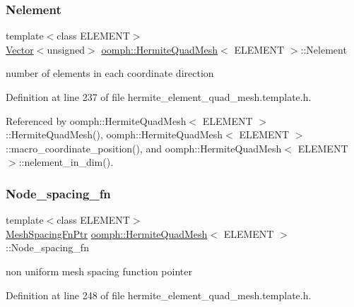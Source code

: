 \subsubsection{\texorpdfstring{Nelement}{Nelement}}
{\footnotesize\ttfamily template$<$class E\+L\+E\+M\+E\+NT$>$ \\
\hyperlink{classoomph_1_1Vector}{Vector}$<$unsigned$>$ \hyperlink{classoomph_1_1HermiteQuadMesh}{oomph\+::\+Hermite\+Quad\+Mesh}$<$ E\+L\+E\+M\+E\+NT $>$\+::Nelement\hspace{0.3cm}{\ttfamily [private]}}



number of elements in each coordinate direction 



Definition at line 237 of file hermite\+\_\+element\+\_\+quad\+\_\+mesh.\+template.\+h.



Referenced by oomph\+::\+Hermite\+Quad\+Mesh$<$ E\+L\+E\+M\+E\+N\+T $>$\+::\+Hermite\+Quad\+Mesh(), oomph\+::\+Hermite\+Quad\+Mesh$<$ E\+L\+E\+M\+E\+N\+T $>$\+::macro\+\_\+coordinate\+\_\+position(), and oomph\+::\+Hermite\+Quad\+Mesh$<$ E\+L\+E\+M\+E\+N\+T $>$\+::nelement\+\_\+in\+\_\+dim().

\mbox{\label{classoomph_1_1HermiteQuadMesh_a3b3cc55576538fc29e6975def870536f}} 
\subsubsection{\texorpdfstring{Node\+\_\+spacing\+\_\+fn}{Node\_spacing\_fn}}
{\footnotesize\ttfamily template$<$class E\+L\+E\+M\+E\+NT$>$ \\
\hyperlink{classoomph_1_1HermiteQuadMesh_abebf4806b300591f976398404ed0ef3f}{Mesh\+Spacing\+Fn\+Ptr} \hyperlink{classoomph_1_1HermiteQuadMesh}{oomph\+::\+Hermite\+Quad\+Mesh}$<$ E\+L\+E\+M\+E\+NT $>$\+::Node\+\_\+spacing\+\_\+fn\hspace{0.3cm}{\ttfamily [private]}}



non uniform mesh spacing function pointer 



Definition at line 248 of file hermite\+\_\+element\+\_\+quad\+\_\+mesh.\+template.\+h.



